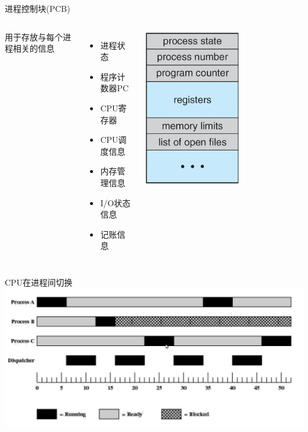 \documentclass[xcolor=svgnames]{beamer}
\begin{document}
\begin{CJK*}{UTF8}{gbsn}
\begin{frame}{进程控制块(PCB)}
\begin{columns}%
用于存放与每个进程相关的信息
\begin{itemize}
\item 进程状态
\item 程序计数器PC
\item CPU寄存器
\item CPU调度信息
\item 内存管理信息
\item I/O状态信息
\item 记账信息
\end{itemize}
\includegraphics[width=0.6\textwidth]{PCB.png}
\end{columns}%
\end{frame}

\begin{frame}{CPU在进程间切换}
\includegraphics[width=1.0\textwidth]{dispatcher.png}
\end{frame}


\end{CJK*}
\end{document}
